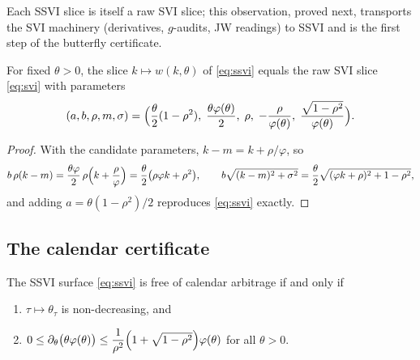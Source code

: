 Each SSVI slice is itself a raw SVI slice; this observation, proved next, transports the SVI
machinery (derivatives, $g$-audits, JW readings) to SSVI and is the first step of the
butterfly certificate.

\begin{lemma}\label{lem:ssvi2svi}
For fixed $\theta>0$, the slice $k\mapsto w(k,\theta)$ of \eqref{eq:ssvi} equals the raw SVI
slice \eqref{eq:svi} with parameters
\begin{equation}\label{eq:ssviraw}
(a,b,\rho,m,\sigma)
=\Bigl(\frac{\theta}{2}(1-\rho^2),\;\frac{\theta\varphi(\theta)}{2},\;\rho,\;
-\frac{\rho}{\varphi(\theta)},\;\frac{\sqrt{1-\rho^2}}{\varphi(\theta)}\Bigr).
\end{equation}
\end{lemma}

\begin{proof}
With the candidate parameters, $k-m=k+\rho/\varphi$, so
\[
b\,\rho(k-m)=\frac{\theta\varphi}{2}\,\rho\Bigl(k+\frac{\rho}{\varphi}\Bigr)
=\frac{\theta}{2}\bigl(\rho\varphi k+\rho^2\bigr),\qquad
b\sqrt{(k-m)^2+\sigma^2}
=\frac{\theta}{2}\sqrt{(\varphi k+\rho)^2+1-\rho^2},
\]
and adding $a=\theta(1-\rho^2)/2$ reproduces \eqref{eq:ssvi} exactly.
\end{proof}

\subsection{The calendar certificate}

\begin{proposition}\label{thm:gjcal}
The SSVI surface \eqref{eq:ssvi} is free of calendar arbitrage if and only if
\begin{enumerate}[label=(\roman*)]
\item $\tau\mapsto\theta_\tau$ is non-decreasing, and
\item $0\le\partial_\theta\bigl(\theta\varphi(\theta)\bigr)\le
\dfrac{1}{\rho^{2}}\Bigl(1+\sqrt{1-\rho^{2}}\Bigr)\varphi(\theta)$ for all $\theta>0$.
\end{enumerate}
\end{proposition}

